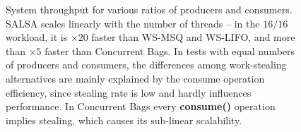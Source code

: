 \begin{figure}[htb]
	\centering
	\caption{\footnotesize{System throughput for various ratios of producers and consumers. SALSA scales linearly with the number of threads -- in the $16/16$ workload, it is $\times20$ faster than WS-MSQ and WS-LIFO, and more than $\times5$ faster than Concurrent Bags. In tests with equal numbers of producers and consumers, the differences among work-stealing alternatives are mainly explained by the consume operation efficiency, since stealing rate is low and hardly influences performance. In Concurrent Bags every {\bf consume()} operation implies stealing, which causes its sub-linear scalability.
}}
	\label{fig:throughput}
\end{figure}

